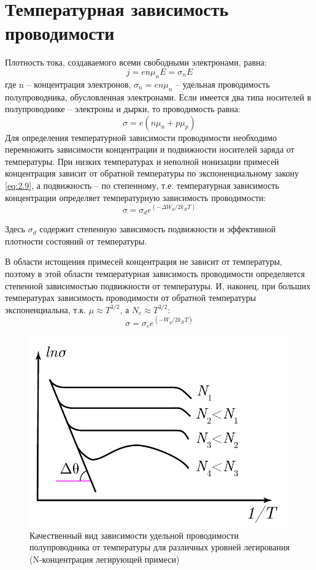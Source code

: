 \section{Температурная зависимость проводимости}
Плотность тока, создаваемого всеми свободными электронами, равна:
\begin{equation}
	j=e n \mu_{n} E=\sigma_{n} E
	\label{eq:4.1}
\end{equation}
где n – концентрация электронов, $\sigma_n = e n \mu_n$ – удельная проводимость полупроводника, обусловленная электронами.
Если имеется два типа носителей в полупроводнике – электроны и дырки,
то проводимость равна:
\begin{equation}
	\sigma=e\left(n \mu_{n}+p \mu_{p}\right)
	\label{eq:4.2}
\end{equation}
Для определения температурной зависимости проводимости необходимо перемножить зависимости концентрации и подвижности носителей заряда от
температуры. При низких температурах и неполной ионизации примесей концентрация зависит от обратной температуры по экспоненциальному закону
\eqref{eq:2.9}, а подвижность – по степенному, т.е. температурная зависимость концентрации определяет температурную зависимость проводимости:
\begin{equation}
	\sigma=\sigma_{d} e^{\left(-\Delta W_{d} / 2 k_{B} T\right)}
	\label{eq:4.3}
\end{equation}

Здесь $\sigma_d$ содержит степенную зависимость подвижности и эффективной плотности состояний от температуры.

В области истощения примесей концентрация не зависит от температуры, поэтому в этой области температурная зависимость проводимости определяется
степенной зависимостью подвижности от температуры. И, наконец, при больших температурах зависимость проводимости от
обратной температуры экспоненциальна, т.к. $\mu \approx T^{3/2}$, а  $N_c \approx T^{3/2}$:
 \begin{equation}
	\sigma=\sigma_{c} e^{\left(-W_{g} / 2 k_{B} T\right)}
	 \label{eq:4.4}
 \end{equation}
 \begin{figure}[h!]
	\centering
	\includegraphics[width = .5\linewidth]{img/41}
	\caption{Качественный вид зависимости удельной проводимости полупроводника от температуры для различных уровней легирования (N-концентрация легирующей примеси)}
	\label{fig:4.1}
\end{figure}
 
